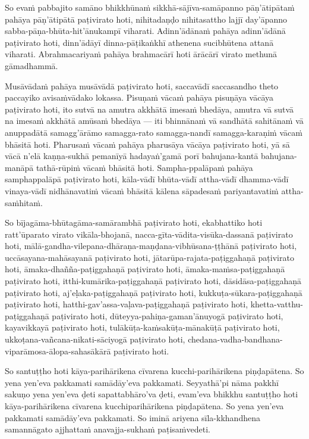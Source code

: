 So evaṁ pabbajito samāno bhikkhūnaṁ sikkhā-sājīva-samāpanno pāṇ'ātipātaṁ pahāya pāṇ'ātipātā paṭivirato hoti, nihitadaṇḍo nihitasattho lajjī day'āpanno sabba-pāṇa-bhūta-hit'ānukampī viharati. Adinn'ādānaṁ pahāya adinn'ādānā paṭivirato hoti, dinn'ādāyī dinna-pāṭikaṅkhī athenena sucibhūtena attanā viharati. Abrahmacariyaṁ pahāya brahmacārī hoti ārācārī virato methunā gāmadhammā.

Musāvādaṁ pahāya musāvādā paṭivirato hoti, saccavādī saccasandho theto paccayiko avisaṁvādako lokassa. Pisuṇaṁ vācaṁ pahāya pisuṇāya vācāya paṭivirato hoti, ito sutvā na amutra akkhātā imesaṁ bhedāya, amutra vā sutvā na imesaṁ akkhātā amūsaṁ bhedāya — iti bhinnānaṁ vā sandhātā sahitānaṁ vā anuppadātā samagg'ārāmo samagga-rato samagga-nandī samagga-karaṇiṁ vācaṁ bhāsitā hoti. Pharusaṁ vācaṁ pahāya pharusāya vācāya paṭivirato hoti, yā sā vācā n'elā kaṇṇa-sukhā pemanīyā hadayaṅ'gamā porī bahujana-kantā bahujana-manāpā tathā-rūpiṁ vācaṁ bhāsitā hoti. Sampha-ppalāpaṁ pahāya samphappalāpā paṭivirato hoti, kāla-vādī bhūta-vādī attha-vādī dhamma-vādī vinaya-vādī nidhānavatiṁ vācaṁ bhāsitā kālena sāpadesaṁ pariyantavatiṁ attha-saṁhitaṁ.

So bījagāma-bhūtagāma-samārambhā paṭivirato hoti, ekabhattiko hoti ratt'ūparato virato vikāla-bhojanā, nacca-gīta-vādita-visūka-dassanā paṭivirato hoti, mālā­-gandha-vilepana­-dhāraṇa­-maṇḍana­-vibhūsana-ṭṭhānā paṭivirato hoti, uccāsayana-mahāsayanā paṭivirato hoti, jātarūpa-rajata-paṭiggahaṇā paṭivirato hoti, āmaka-dhañña-paṭiggahaṇā paṭivirato hoti, āmaka-maṁsa-paṭiggahaṇā paṭivirato hoti, itthi-kumārika-paṭiggahaṇā paṭivirato hoti, dāsidāsa-paṭiggahaṇā paṭivirato hoti, aj'eḷaka-paṭiggahaṇā paṭivirato hoti, kukkuṭa-sūkara-paṭiggahaṇā paṭivirato hoti, hatthi-gav'assa-vaḷava-paṭiggahaṇā paṭivirato hoti, khetta-vatthu-paṭiggahaṇā paṭivirato hoti, dūteyya-pahiṇa-gaman'ānuyogā paṭivirato hoti, kayavikkayā paṭivirato hoti, tulākūṭa-kaṁsakūṭa-mānakūṭā paṭivirato hoti, ukkoṭana-vañcana-nikati-sāciyogā paṭivirato hoti, chedana-­vadha-bandhana­-viparāmosa-ālopa-sahasākārā paṭivirato hoti.

So santuṭṭho hoti kāya-parihārikena cīvarena kucchi-parihārikena piṇḍapātena. So yena yen'eva pakkamati samādāy'eva pakkamati. Seyyathā'pi nāma pakkhī sakuṇo yena yen'eva ḍeti sapattabhāro'va ḍeti, evam'eva bhikkhu santuṭṭho hoti kāya-parihārikena cīvarena kucchiparihārikena piṇḍapātena. So yena yen'eva pakkamati samādāy'eva pakkamati. So iminā ariyena sīla-kkhandhena samannāgato ajjhattaṁ anavajja-sukhaṁ paṭisaṁvedeti.

\suttaRef{[MN 51]}


